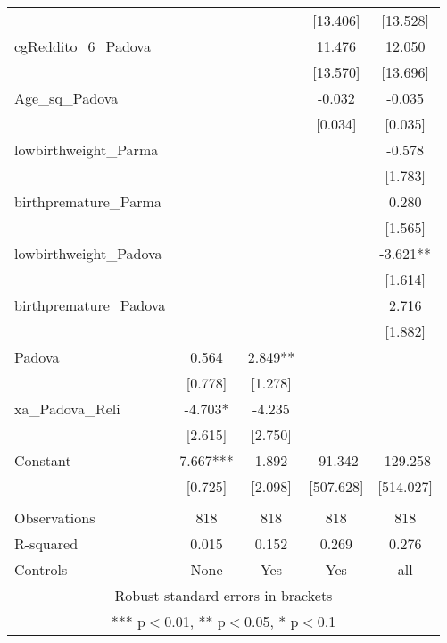 \documentclass[]{article}
\begin{document}
\begin{tabular}{lcccc}
 &  &  & [13.406] & [13.528] \\
cgReddito\_6\_Padova &  &  & 11.476 & 12.050 \\
 &  &  & [13.570] & [13.696] \\
Age\_sq\_Padova &  &  & -0.032 & -0.035 \\
 &  &  & [0.034] & [0.035] \\
lowbirthweight\_Parma &  &  &  & -0.578 \\
 &  &  &  & [1.783] \\
birthpremature\_Parma &  &  &  & 0.280 \\
 &  &  &  & [1.565] \\
lowbirthweight\_Padova &  &  &  & -3.621** \\
 &  &  &  & [1.614] \\
birthpremature\_Padova &  &  &  & 2.716 \\
 &  &  &  & [1.882] \\
Padova & 0.564 & 2.849** &  &  \\
 & [0.778] & [1.278] &  &  \\
xa\_Padova\_Reli & -4.703* & -4.235 &  &  \\
 & [2.615] & [2.750] &  &  \\
Constant & 7.667*** & 1.892 & -91.342 & -129.258 \\
 & [0.725] & [2.098] & [507.628] & [514.027] \\
 &  &  &  &  \\
Observations & 818 & 818 & 818 & 818 \\
R-squared & 0.015 & 0.152 & 0.269 & 0.276 \\
 Controls & None & Yes & Yes & all \\ \hline
\multicolumn{5}{c}{ Robust standard errors in brackets} \\
\multicolumn{5}{c}{ *** p$<$0.01, ** p$<$0.05, * p$<$0.1} \\
\end{tabular}
\end{document}
